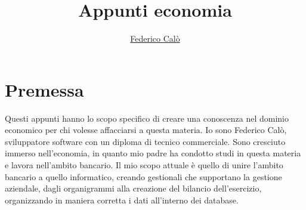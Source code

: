 \documentclass[a4paper]{extarticle}
\title{Appunti economia}
\author{\href{http://www.federicocalo.dev}{Federico Calò} }
\date{}
\begin{document}
\maketitle
\newpage
\tableofcontents
\voffset -30pt

\newpage

\section*{Premessa}

Questi appunti hanno lo scopo specifico di creare una conoscenza nel dominio economico per chi volesse affacciarsi a questa materia. Io sono Federico Calò, sviluppatore software con un diploma di tecnico commerciale. Sono cresciuto immerso nell'economia, in quanto mio padre ha condotto studi in questa materia e lavora nell'ambito bancario. Il mio scopo attuale è quello di unire l'ambito bancario a quello informatico, creando gestionali che supportano la gestione aziendale, dagli organigrammi alla creazione del bilancio dell'esercizio, organizzando in maniera corretta i dati all'interno dei database.
\end{document}

